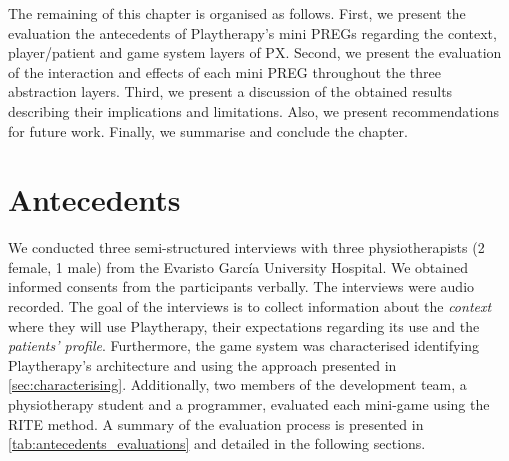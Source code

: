 The remaining of this chapter is organised as follows. First, we present the evaluation the antecedents of Playtherapy's mini \acp{PREG} regarding the context, player/patient and game system layers of \ac{PX}. Second, we present the evaluation of the interaction and effects of each mini \ac{PREG} throughout the three abstraction layers. Third, we present a discussion of the obtained results describing their implications and limitations. Also, we present recommendations for future work. Finally, we summarise and conclude the chapter.

\section{Antecedents}
We conducted three semi-structured interviews with three physiotherapists (2 female, 1 male) from the Evaristo Garc\'ia University Hospital. We obtained informed consents from the participants verbally. The interviews were audio recorded. The goal of the interviews is to collect information about the \emph{context} where they will use Playtherapy, their expectations regarding its use and the \emph{patients' profile}. Furthermore, the game system was characterised identifying Playtherapy's architecture and using the approach presented in \autoref{sec:characterising}. Additionally, two members of the development team, a physiotherapy student and a programmer, evaluated each mini-game using the \ac{RITE} method. A summary of the evaluation process is presented in \autoref{tab:antecedents_evaluations} and detailed in the following sections.

